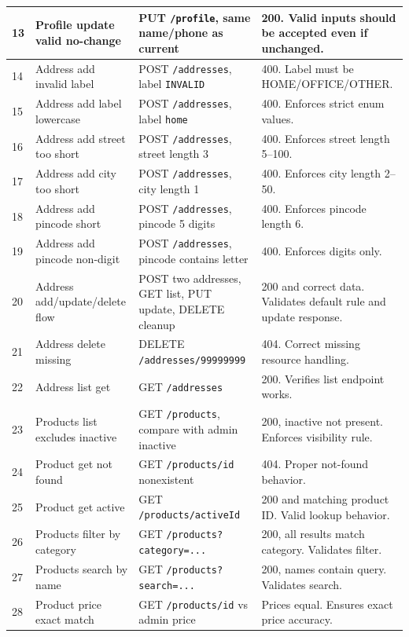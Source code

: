 \documentclass[11pt]{article}
\begin{document}
\begin{longtable}{|p{0.7cm}|p{3.2cm}|p{6.7cm}|p{3.2cm}|}
13 & Profile update valid no-change & PUT \texttt{/profile}, same name/phone as current & 200. Valid inputs should be accepted even if unchanged. \\
\hline
14 & Address add invalid label & POST \texttt{/addresses}, label \texttt{INVALID} & 400. Label must be HOME/OFFICE/OTHER. \\
\hline
15 & Address add label lowercase & POST \texttt{/addresses}, label \texttt{home} & 400. Enforces strict enum values. \\
\hline
16 & Address add street too short & POST \texttt{/addresses}, street length 3 & 400. Enforces street length 5--100. \\
\hline
17 & Address add city too short & POST \texttt{/addresses}, city length 1 & 400. Enforces city length 2--50. \\
\hline
18 & Address add pincode short & POST \texttt{/addresses}, pincode 5 digits & 400. Enforces pincode length 6. \\
\hline
19 & Address add pincode non-digit & POST \texttt{/addresses}, pincode contains letter & 400. Enforces digits only. \\
\hline
20 & Address add/update/delete flow & POST two addresses, GET list, PUT update, DELETE cleanup & 200 and correct data. Validates default rule and update response. \\
\hline
21 & Address delete missing & DELETE \texttt{/addresses/99999999} & 404. Correct missing resource handling. \\
\hline
22 & Address list get & GET \texttt{/addresses} & 200. Verifies list endpoint works. \\
\hline
23 & Products list excludes inactive & GET \texttt{/products}, compare with admin inactive & 200, inactive not present. Enforces visibility rule. \\
\hline
24 & Product get not found & GET \texttt{/products/{id}} nonexistent & 404. Proper not-found behavior. \\
\hline
25 & Product get active & GET \texttt{/products/{activeId}} & 200 and matching product ID. Valid lookup behavior. \\
\hline
26 & Products filter by category & GET \texttt{/products?category=...} & 200, all results match category. Validates filter. \\
\hline
27 & Products search by name & GET \texttt{/products?search=...} & 200, names contain query. Validates search. \\
\hline
28 & Product price exact match & GET \texttt{/products/{id}} vs admin price & Prices equal. Ensures exact price accuracy. \\

\end{longtable}
\end{document}
